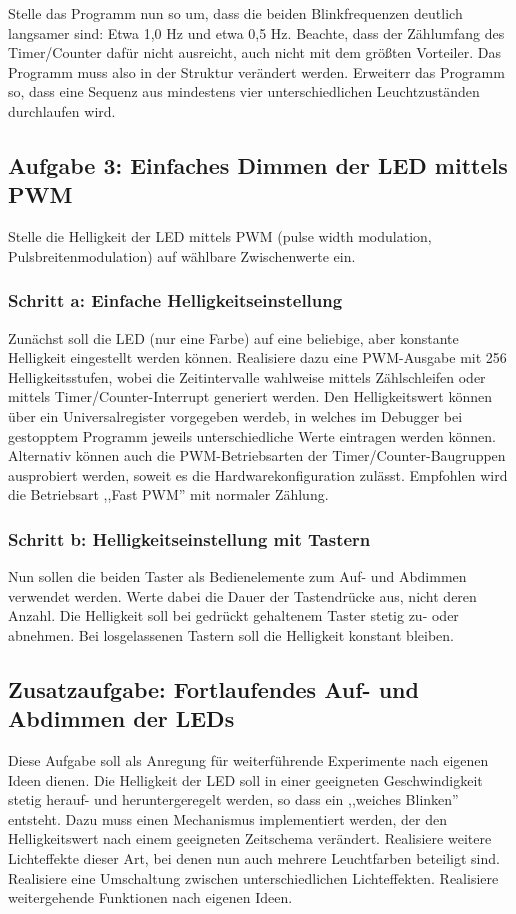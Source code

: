 \documentclass[a4paper,12pt,titlepage]{scrartcl}
\begin{document}
Stelle das Programm nun so um, dass die beiden Blinkfrequenzen deutlich langsamer sind: Etwa 1,0 Hz und etwa 0,5 Hz. Beachte, dass der Zählumfang des Timer/Counter dafür nicht ausreicht, auch nicht mit dem größten Vorteiler. Das Programm muss also in der Struktur verändert werden. Erweiterr das Programm so, dass eine Sequenz aus mindestens vier unterschiedlichen Leuchtzuständen durchlaufen wird.


\subsection*{Aufgabe 3: Einfaches Dimmen der LED mittels PWM}
Stelle die Helligkeit der LED mittels PWM (pulse width modulation, Pulsbreitenmodulation) auf wählbare Zwischenwerte ein.

\subsubsection*{Schritt a: Einfache Helligkeitseinstellung}
Zunächst soll die LED (nur eine Farbe) auf eine beliebige, aber konstante Helligkeit eingestellt werden können. Realisiere dazu eine PWM-Ausgabe mit 256 Helligkeitsstufen, wobei die Zeitintervalle wahlweise mittels Zählschleifen oder mittels Timer/Counter-Interrupt generiert werden. Den Helligkeitswert können über ein Universalregister vorgegeben werdeb, in welches im Debugger bei gestopptem Programm jeweils unterschiedliche Werte eintragen werden können.
Alternativ können auch die PWM-Betriebsarten der Timer/Counter-Baugruppen ausprobiert werden, soweit es die Hardwarekonfiguration zulässt. Empfohlen wird die Betriebsart ,,Fast PWM'' mit normaler Zählung.

\subsubsection*{Schritt b: Helligkeitseinstellung mit Tastern}
Nun sollen die beiden Taster als Bedienelemente zum Auf- und Abdimmen verwendet werden. Werte dabei die Dauer der Tastendrücke aus, nicht deren Anzahl. Die Helligkeit soll bei gedrückt gehaltenem Taster stetig zu- oder abnehmen. Bei losgelassenen Tastern soll die Helligkeit konstant bleiben.

\subsection*{Zusatzaufgabe: Fortlaufendes Auf- und Abdimmen der LEDs}
Diese Aufgabe soll als Anregung für weiterführende Experimente nach eigenen Ideen dienen. Die Helligkeit der LED soll in einer geeigneten Geschwindigkeit stetig herauf- und heruntergeregelt werden, so dass ein ,,weiches Blinken'' entsteht. Dazu muss einen Mechanismus implementiert werden, der den Helligkeitswert nach einem geeigneten Zeitschema verändert.
Realisiere weitere Lichteffekte dieser Art, bei denen nun auch mehrere Leuchtfarben beteiligt sind. 
Realisiere eine Umschaltung zwischen unterschiedlichen Lichteffekten. 
Realisiere weitergehende Funktionen nach eigenen Ideen.
\end{document}

